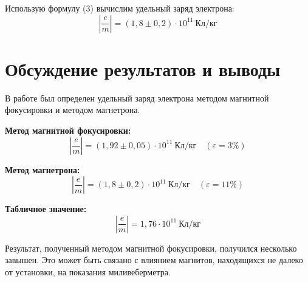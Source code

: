 Использую формулу (3) вычислим удельный заряд электрона:
\[
    \left| \frac{e}{m}\right| = (1,8 \pm 0,2) \cdot 10^{11}\ \text{Кл/кг}
\] 
\section{Обсуждение результатов и выводы}
В работе был определен удельный заряд электрона методом магнитной фокусировки и методом
магнетрона.

\textbf{Метод магнитной фокусировки:}
\[
    \left|\frac{e}{m} \right| = (1,92\pm 0,05) \cdot 10^{11}\ \text{Кл/кг} \quad (\varepsilon =
    3\%)
\] 

\textbf{Метод магнетрона:}
\[
    \left|\frac{e}{m} \right| = (1,8\pm 0,2) \cdot 10^{11}\ \text{Кл/кг} \quad (\varepsilon =
    11\%)
\] 

\textbf{Табличное значение:}
\[
    \left| \frac{e}{m} \right| = 1,76 \cdot 10^{11}\ \text{Кл/кг}
\] 

Результат, полученный методом магнитной фокусировки, получился несколько завышен. Это может быть связано с
влиянием магнитов, находящихся не далеко от установки, на показания миливеберметра.


